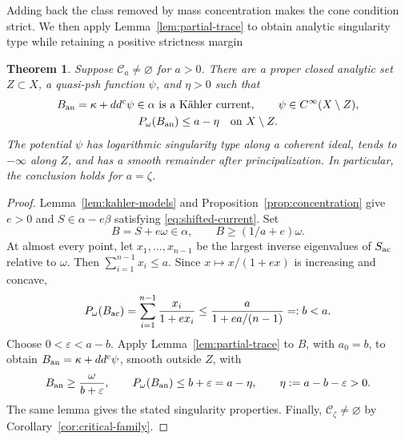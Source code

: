 \documentclass[reqno]{amsart}
\numberwithin{equation}{section}
\newtheorem{theorem}{Theorem}[section]
\theoremstyle{definition}
\begin{document}
Adding back the class removed by mass concentration makes
the cone condition strict. We then apply
Lemma~\ref{lem:partial-trace}
to obtain analytic singularity type while retaining a
positive strictness margin
\begin{theorem}
\label{thm:strict-subsolution}
Suppose $\mathcal C_a\ne\varnothing$ for $a>0$.
There are a proper closed analytic set $Z\subset X$, a quasi-psh
function $\psi$, and $\eta>0$ such that
\begin{equation}\label{eq:strict-subsolution}
 \begin{gathered}
 B_{\rm an}=\kappa+dd^c\psi\in\alpha
       \text{ is a K\"ahler current},\qquad
 \psi\in C^\infty(X\setminus Z),\\
 P_\omega(B_{\rm an})\le a-\eta\quad\text{on }X\setminus Z.
 \end{gathered}
\end{equation}
The potential $\psi$ has logarithmic singularity type along a coherent
ideal, tends to $-\infty$ along $Z$, and has a smooth remainder
after principalization. In particular, the conclusion holds for
$a=\zeta$.
\end{theorem}

\begin{proof}
Lemma~\ref{lem:kahler-models} and
Proposition~\ref{prop:concentration}
give $e>0$ and $S\in\alpha-e\beta$ satisfying
\eqref{eq:shifted-current}. Set
\[
 B=S+e\omega\in\alpha,\qquad B\ge(1/a+e)\omega.
\]
At almost every point, let $x_1,\ldots,x_{n-1}$ be the largest
inverse eigenvalues of $S_{\rm ac}$ relative to $\omega$.
Then $\sum_{i=1}^{n-1}x_i\le a$. Since
$x\mapsto x/(1+ex)$ is increasing and concave,
\begin{equation}\label{eq:strict-margin}
 P_\omega(B_{\rm ac})
 =\sum_{i=1}^{n-1}\frac{x_i}{1+ex_i}
 \le\frac{a}{1+ea/(n-1)}=:b<a.
\end{equation}
Choose $0<\varepsilon<a-b$. Apply
Lemma~\ref{lem:partial-trace} to $B$, with
$a_0=b$, to obtain $B_{\rm an}=\kappa+dd^c\psi$, smooth outside
$Z$, with
\[
 B_{\rm an}\ge\frac{\omega}{b+\varepsilon},\qquad
 P_\omega(B_{\rm an})\le b+\varepsilon=a-\eta,
 \qquad \eta:=a-b-\varepsilon>0.
\]
The same lemma gives the stated singularity properties.
Finally, $\mathcal C_\zeta\ne\varnothing$ by
Corollary~\ref{cor:critical-family}.
\end{proof}
\end{document}
